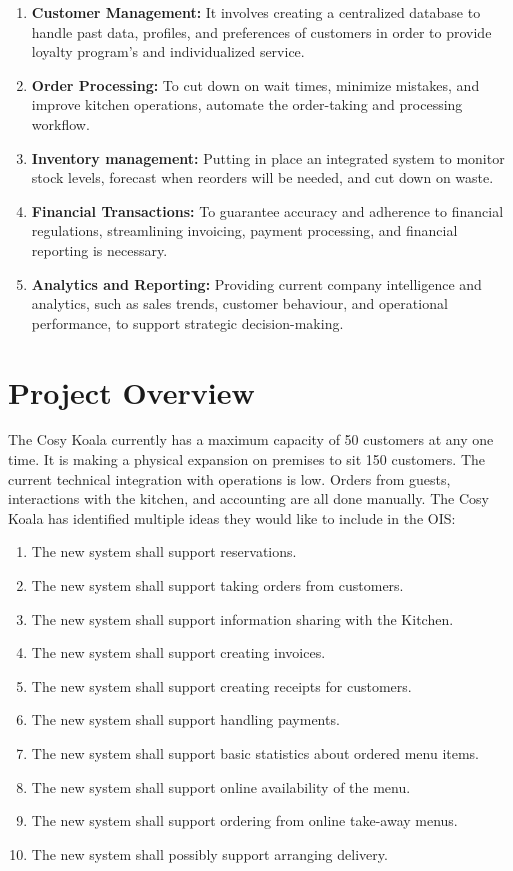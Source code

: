 \documentclass{article}
\begin{document}
\begin{enumerate}
    \item \textbf{Customer Management:} It involves creating a centralized database to handle past data, profiles, and preferences of customers in order to provide loyalty program's and individualized service.
    
    \item \textbf{Order Processing:} To cut down on wait times, minimize mistakes, and improve kitchen operations, automate the order-taking and processing workflow.
    
    \item \textbf{Inventory management:} Putting in place an integrated system to monitor stock levels, forecast when reorders will be needed, and cut down on waste.

    \item \textbf{Financial Transactions:}  To guarantee accuracy and adherence to financial regulations, streamlining invoicing, payment processing, and financial reporting is necessary.

    \item \textbf{Analytics and Reporting:}  Providing current company intelligence and analytics, such as sales trends, customer behaviour, and operational performance, to support strategic decision-making.

    
\end{enumerate}


\clearpage
\section{Project Overview}
The Cosy Koala currently has a maximum capacity of 50 customers at any one time. It is making a physical expansion on premises to sit 150 customers. The current technical integration with operations is low. Orders from guests, interactions with the kitchen, and accounting are all done manually.
The Cosy Koala has identified multiple ideas they would like to include in the OIS:
\begin{enumerate}
    \item The new system shall support reservations.
    \item The new system shall support taking orders from customers.
    \item The new system shall support information sharing with the Kitchen.
    \item The new system shall support creating invoices.
    \item The new system shall support creating receipts for customers.
    \item The new system shall support handling payments.
    \item The new system shall support basic statistics about ordered menu items.
    \item The new system shall support online availability of the menu.
    \item The new system shall support ordering from online take-away menus.
    \item The new system shall possibly support arranging delivery.
\end{enumerate}
\end{document}
